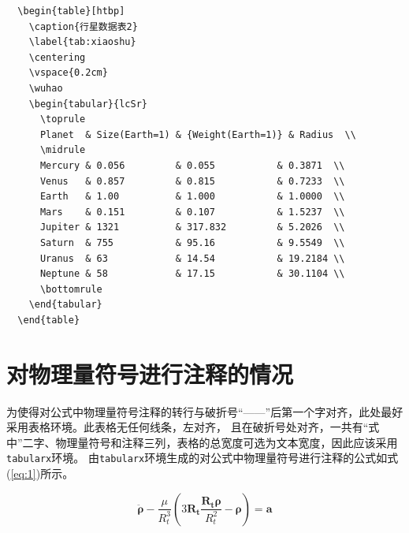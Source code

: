 \begin{lstlisting}
  \begin{table}[htbp]
    \caption{行星数据表2}
    \label{tab:xiaoshu}
    \centering
    \vspace{0.2cm}
    \wuhao
    \begin{tabular}{lcSr}
      \toprule
      Planet  & Size(Earth=1) & {Weight(Earth=1)} & Radius  \\
      \midrule
      Mercury & 0.056         & 0.055           & 0.3871  \\
      Venus   & 0.857         & 0.815           & 0.7233  \\
      Earth   & 1.00          & 1.000           & 1.0000  \\
      Mars    & 0.151         & 0.107           & 1.5237  \\
      Jupiter & 1321          & 317.832         & 5.2026  \\
      Saturn  & 755           & 95.16           & 9.5549  \\
      Uranus  & 63            & 14.54           & 19.2184 \\
      Neptune & 58            & 17.15           & 30.1104 \\
      \bottomrule
    \end{tabular}
  \end{table}
\end{lstlisting}

\section{对物理量符号进行注释的情况}

为使得对公式中物理量符号注释的转行与破折号“——”后第一个字对齐，此处最好采用表格环境。此表格无任何线条，左对齐，
且在破折号处对齐，一共有“式中”二字、物理量符号和注释三列，表格的总宽度可选为文本宽度，因此应该采用\verb|tabularx|环境。
由\verb|tabularx|环境生成的对公式中物理量符号进行注释的公式如式(\ref{eq:1})所示。

\begin{equation}\label{eq:1}
  \ddot{\boldsymbol{\rho}}-\frac{\mu}{R_{t}^{3}}\left(3\mathbf{R_{t}}\frac{\mathbf{R_{t}\rho}}{R_{t}^{2}}-\boldsymbol{\rho}\right)=\mathbf{a}
\end{equation}

